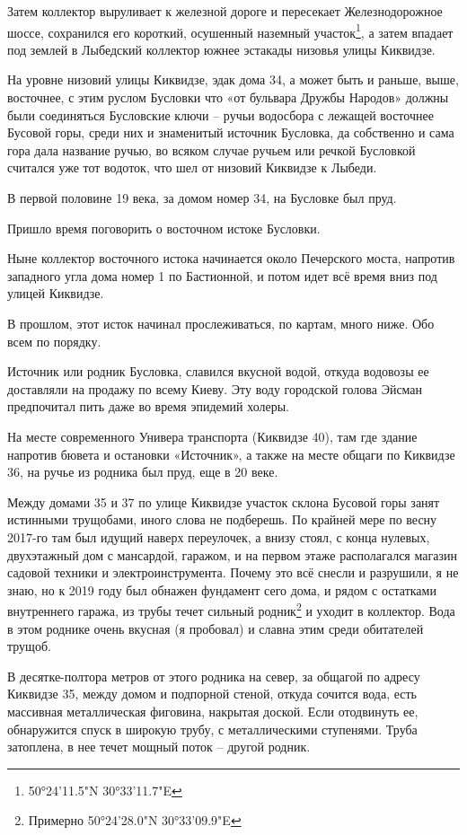 Затем коллектор выруливает к железной дороге и пересекает Железнодорожное шоссе, сохранился его короткий, осушенный наземный участок\footnote{50°24'11.5"N 30°33'11.7"E}, а затем впадает под землей в Лыбедский коллектор южнее эстакады низовья улицы Киквидзе.

На уровне низовий улицы Киквидзе, эдак дома 34, а может быть и раньше, выше, восточнее, с этим руслом Бусловки что «от бульвара Дружбы Народов» должны были соединяться Бусловские ключи – ручьи водосбора с лежащей восточнее Бусовой горы, среди них и знаменитый источник Бусловка, да собственно и сама гора дала название ручью, во всяком случае ручьем или речкой Бусловкой считался уже тот водоток, что шел от низовий Киквидзе к Лыбеди.

В первой половине 19 века, за домом номер 34, на Бусловке был пруд.

Пришло время поговорить о восточном истоке Бусловки.

Ныне коллектор восточного истока начинается около Печерского моста, напротив западного угла дома номер 1 по Бастионной, и потом идет всё время вниз под улицей Киквидзе. 

В прошлом, этот исток начинал прослеживаться, по картам, много ниже. Обо всем по порядку.

Источник или родник Бусловка, славился вкусной водой, откуда водовозы ее доставляли на продажу по всему Киеву. Эту воду городской голова Эйсман предпочитал пить даже во время эпидемий холеры.

На месте современного Универа транспорта (Киквидзе 40), там где здание напротив бювета и остановки «Источник», а также на месте общаги по Киквидзе 36,  на ручье из родника был пруд, еще в 20 веке.  

Между домами 35 и 37 по улице Киквидзе участок склона Бусовой горы занят истинными трущобами, иного слова не подберешь. По крайней мере по весну 2017-го там был идущий наверх переулочек, а внизу стоял, с конца нулевых, двухэтажный дом с мансардой, гаражом, и на первом этаже располагался магазин садовой техники и электроинструмента. Почему это всё снесли и разрушили, я не знаю, но к 2019 году был обнажен фундамент сего дома, и рядом с остатками внутреннего гаража, из трубы течет сильный родник\footnote{Примерно 50°24'28.0"N 30°33'09.9"E} и уходит в коллектор. Вода в этом роднике очень вкусная (я пробовал) и славна этим среди обитателей трущоб.

В десятке-полтора метров от этого родника на север, за общагой по адресу Киквидзе 35, между домом и подпорной стеной, откуда сочится вода, есть массивная металлическая фиговина, накрытая доской. Если отодвинуть ее, обнаружится спуск в широкую трубу, с металлическими ступенями. Труба затоплена, в нее течет мощный поток – другой родник.

